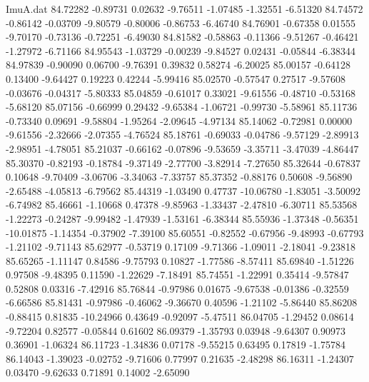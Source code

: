 \begin{filecontents}{ImuA.dat}
  84.72282   -0.89731    0.02632   -9.76511   -1.07485   -1.32551   -6.51320
  84.74572   -0.86142   -0.03709   -9.80579   -0.80006   -0.86753   -6.46740
  84.76901   -0.67358    0.01555   -9.70170   -0.73136   -0.72251   -6.49030
  84.81582   -0.58863   -0.11366   -9.51267   -0.46421   -1.27972   -6.71166
  84.95543   -1.03729   -0.00239   -9.84527    0.02431   -0.05844   -6.38344
  84.97839   -0.90090    0.06700   -9.76391    0.39832    0.58274   -6.20025
  85.00157   -0.64128    0.13400   -9.64427    0.19223    0.42244   -5.99416
  85.02570   -0.57547    0.27517   -9.57608   -0.03676   -0.04317   -5.80333
  85.04859   -0.61017    0.33021   -9.61556   -0.48710   -0.53168   -5.68120
  85.07156   -0.66999    0.29432   -9.65384   -1.06721   -0.99730   -5.58961
  85.11736   -0.73340    0.09691   -9.58804   -1.95264   -2.09645   -4.97134
  85.14062   -0.72981    0.00000   -9.61556   -2.32666   -2.07355   -4.76524
  85.18761   -0.69033   -0.04786   -9.57129   -2.89913   -2.98951   -4.78051
  85.21037   -0.66162   -0.07896   -9.53659   -3.35711   -3.47039   -4.86447
  85.30370   -0.82193   -0.18784   -9.37149   -2.77700   -3.82914   -7.27650
  85.32644   -0.67837    0.10648   -9.70409   -3.06706   -3.34063   -7.33757
  85.37352   -0.88176    0.50608   -9.56890   -2.65488   -4.05813   -6.79562
  85.44319   -1.03490    0.47737  -10.06780   -1.83051   -3.50092   -6.74982
  85.46661   -1.10668    0.47378   -9.85963   -1.33437   -2.47810   -6.30711
  85.53568   -1.22273   -0.24287   -9.99482   -1.47939   -1.53161   -6.38344
  85.55936   -1.37348   -0.56351  -10.01875   -1.14354   -0.37902   -7.39100
  85.60551   -0.82552   -0.67956   -9.48993   -0.67793   -1.21102   -9.71143
  85.62977   -0.53719    0.17109   -9.71366   -1.09011   -2.18041   -9.23818
  85.65265   -1.11147    0.84586   -9.75793    0.10827   -1.77586   -8.57411
  85.69840   -1.51226    0.97508   -9.48395    0.11590   -1.22629   -7.18491
  85.74551   -1.22991    0.35414   -9.57847    0.52808    0.03316   -7.42916
  85.76844   -0.97986    0.01675   -9.67538   -0.01386   -0.32559   -6.66586
  85.81431   -0.97986   -0.46062   -9.36670    0.40596   -1.21102   -5.86440
  85.86208   -0.88415    0.81835  -10.24966    0.43649   -0.92097   -5.47511
  86.04705   -1.29452    0.08614   -9.72204    0.82577   -0.05844    0.61602
  86.09379   -1.35793    0.03948   -9.64307    0.90973    0.36901   -1.06324
  86.11723   -1.34836    0.07178   -9.55215    0.63495    0.17819   -1.75784
  86.14043   -1.39023   -0.02752   -9.71606    0.77997    0.21635   -2.48298
  86.16311   -1.24307    0.03470   -9.62633    0.71891    0.14002   -2.65090

\end{filecontents}
